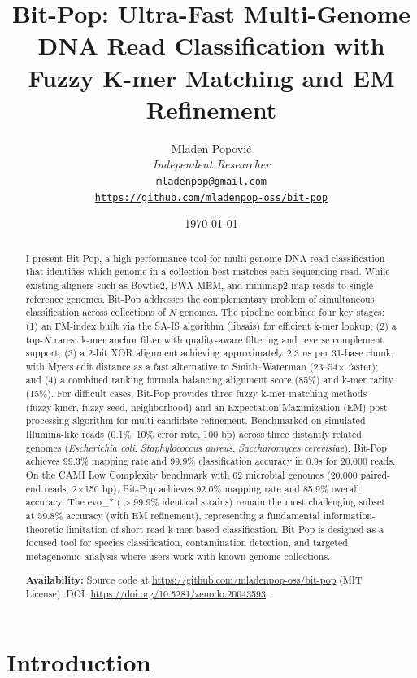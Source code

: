 \documentclass{article}
\title{Bit-Pop: Ultra-Fast Multi-Genome DNA Read Classification with Fuzzy K-mer Matching and EM Refinement}
\author{Mladen Popovi\'c\\
\textit{Independent Researcher} \\
\texttt{mladenpop@gmail.com} \\
\texttt{\url{https://github.com/mladenpop-oss/bit-pop}}}
\date{\today}
\begin{document}
\maketitle

\begin{abstract}
I present Bit-Pop, a high-performance tool for multi-genome DNA read classification that identifies which genome in a collection best matches each sequencing read. While existing aligners such as Bowtie2, BWA-MEM, and minimap2 map reads to single reference genomes, Bit-Pop addresses the complementary problem of simultaneous classification across collections of $N$ genomes. The pipeline combines four key stages: (1) an FM-index built via the SA-IS algorithm (libsais) for efficient k-mer lookup; (2) a top-$N$ rarest k-mer anchor filter with quality-aware filtering and reverse complement support; (3) a 2-bit XOR alignment achieving approximately 2.3 ns per 31-base chunk, with Myers edit distance as a fast alternative to Smith--Waterman (23--54$\times$ faster); and (4) a combined ranking formula balancing alignment score (85\%) and k-mer rarity (15\%). For difficult cases, Bit-Pop provides three fuzzy k-mer matching methods (fuzzy-kmer, fuzzy-seed, neighborhood) and an Expectation-Maximization (EM) post-processing algorithm for multi-candidate refinement. Benchmarked on simulated Illumina-like reads (0.1\%--10\% error rate, 100 bp) across three distantly related genomes (\textit{Escherichia coli}, \textit{Staphylococcus aureus}, \textit{Saccharomyces cerevisiae}), Bit-Pop achieves 99.3\% mapping rate and 99.9\% classification accuracy in 0.9s for 20,000 reads. On the CAMI Low Complexity benchmark with 62 microbial genomes (20,000 paired-end reads, 2$\times$150 bp), Bit-Pop achieves 92.0\% mapping rate and 85.9\% overall accuracy. The evo\_* ($>$99.9\% identical strains) remain the most challenging subset at 59.8\% accuracy (with EM refinement), representing a fundamental information-theoretic limitation of short-read k-mer-based classification. Bit-Pop is designed as a focused tool for species classification, contamination detection, and targeted metagenomic analysis where users work with known genome collections.

\textbf{Availability:} Source code at \url{https://github.com/mladenpop-oss/bit-pop} (MIT License). DOI: \url{https://doi.org/10.5281/zenodo.20043593}.
\end{abstract}

\section{Introduction}
\end{document}
